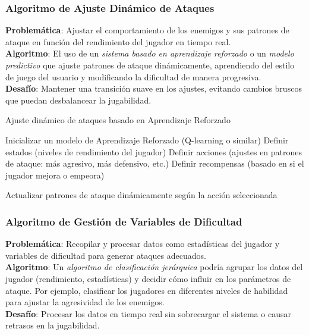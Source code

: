 \subsubsection*{Algoritmo de Ajuste Dinámico de Ataques}
\textbf{Problemática}: Ajustar el comportamiento de los enemigos y sus patrones de ataque en función del rendimiento del jugador en tiempo real.\\
\textbf{Algoritmo}: El uso de un \textit{sistema basado en aprendizaje reforzado} o un \textit{modelo predictivo} que ajuste patrones de ataque dinámicamente, aprendiendo del estilo de juego del usuario y modificando la dificultad de manera progresiva.\\
\textbf{Desafío}: Mantener una transición suave en los ajustes, evitando cambios bruscos que puedan desbalancear la jugabilidad.

\begin{algorithm}[H]
\caption{Ajuste dinámico de ataques basado en Aprendizaje Reforzado}
\SetAlgoLined

Inicializar un modelo de Aprendizaje Reforzado (Q-learning o similar)\;
Definir estados (niveles de rendimiento del jugador)\;
Definir acciones (ajustes en patrones de ataque: más agresivo, más defensivo, etc.)\;
Definir recompensas (basado en si el jugador mejora o empeora)\;


Actualizar patrones de ataque dinámicamente según la acción seleccionada\;

\end{algorithm}


\subsubsection*{Algoritmo de Gestión de Variables de Dificultad}
\textbf{Problemática}: Recopilar y procesar datos como estadísticas del jugador y variables de dificultad para generar ataques adecuados.\\
\textbf{Algoritmo}: Un \textit{algoritmo de clasificación jerárquica} podría agrupar los datos del jugador (rendimiento, estadísticas) y decidir cómo influir en los parámetros de ataque. Por ejemplo, clasificar los jugadores en diferentes niveles de habilidad para ajustar la agresividad de los enemigos.\\
\textbf{Desafío}: Procesar los datos en tiempo real sin sobrecargar el sistema o causar retrasos en la jugabilidad.

